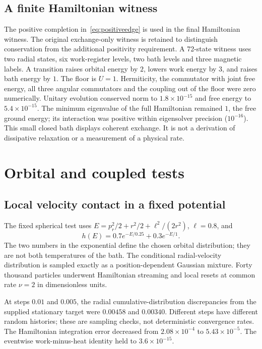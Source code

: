 \documentclass[11pt]{article}
\begin{document}
\subsection{A finite Hamiltonian witness}
The positive completion in~\eqref{eq:positiveedge} is used in the final
Hamiltonian witness. The original exchange-only witness is retained to
distinguish conservation from the additional positivity requirement.
A 72-state witness uses two radial states, six work-register levels, two
bath levels and three magnetic labels. A transition raises orbital energy
by $2$, lowers work energy by $3$, and raises bath energy by $1$. The
floor is $U=1$. Hermiticity, the commutator with joint free energy, all
three angular commutators and the coupling out of the floor were zero
numerically. Unitary evolution conserved norm to $1.8\times10^{-15}$ and
free energy to $5.4\times10^{-15}$. The minimum eigenvalue of the full
Hamiltonian remained $1$, the free ground energy; its interaction was
positive within eigensolver precision ($10^{-16}$).
This small closed bath displays coherent exchange. It is not a derivation
of dissipative relaxation or a measurement of a physical rate.

\section{Orbital and coupled tests}
\subsection{Local velocity contact in a fixed potential}
The fixed spherical test uses
$E=p_r^2/2+r^2/2+\ell^2/(2r^2)$, $\ell=0.8$, and
\begin{equation}
 h(E)=0.7e^{-E/0.25}+0.3e^{-E/1}.
\end{equation}
The two numbers in the exponential define the chosen orbital distribution;
they are not both temperatures of the bath. The conditional radial-velocity
distribution is sampled exactly as a position-dependent Gaussian mixture.
Forty thousand particles underwent Hamiltonian streaming and local resets
at common rate $\nu=2$ in dimensionless units.

At steps $0.01$ and $0.005$, the radial cumulative-distribution discrepancies
from the supplied stationary target were $0.00458$ and $0.00340$.
Different steps have different random histories; these are sampling checks,
not deterministic convergence rates. The Hamiltonian integration error
decreased from $2.08\times10^{-4}$ to $5.43\times10^{-5}$. The eventwise
work-minus-heat identity held to $3.6\times10^{-15}$.
\end{document}
